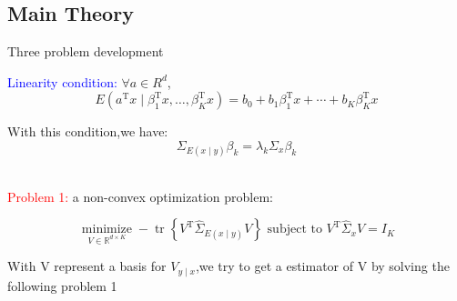 \documentclass{beamer}
\begin{document}
\subsection{Main Theory}
\begin{frame}{Three problem development}

  \textcolor{blue}{Linearity condition:} $ \forall a \in R^d $,
\begin{equation}
    E\left(a^{\mathrm{T}} x \mid \beta_{1}^{\mathrm{T}} x, \ldots, \beta_{K}^{\mathrm{T}} x\right)=b_{0}+b_{1} \beta_{1}^{\mathrm{T}} x+\cdots+b_{K} \beta_{K}^{\mathrm{T}} x
\end{equation}


With this condition,we have: 
\begin{equation}
    {\Sigma}_{E\left( x\mid y\right)} \beta_{k} = \lambda_{k}\Sigma_{x}\beta_{k}
\end{equation}

\\ \textcolor{red}{Problem 1:} a non-convex optimization problem:

\begin{equation}
   \underset{V \in \mathbb{R}^{d \times K}}{\operatorname{minimize}}-\operatorname{tr}\left\{V^{\mathrm{T}} \hat{\Sigma}_{E(x \mid y)} V\right\} \text { subject to } V^{\mathrm{T}} \hat{\Sigma}_{x} V=I_{K}
\end{equation}

\setlength{\parindent}{2em}With V represent a basis for $V_{y\mid x}$,we try to get a estimator of V by solving the following problem 1
\end{frame}
\end{document}
